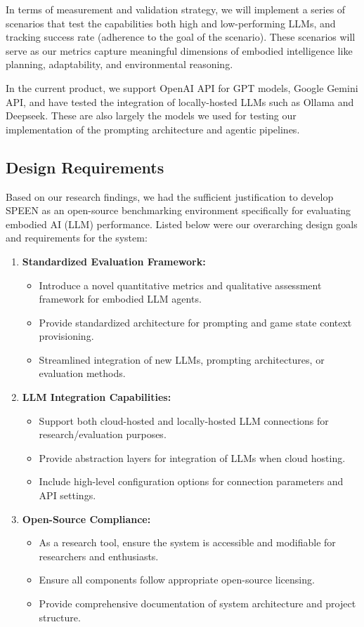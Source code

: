 \documentclass{article}
\begin{document}
In terms of measurement and validation strategy, we will implement a series of scenarios that test the capabilities both high and low-performing LLMs, and tracking success rate (adherence to the goal of the scenario).
These scenarios will serve as our metrics capture meaningful dimensions of embodied intelligence like planning, adaptability, and environmental reasoning.

In the current product, we support OpenAI API for GPT models, Google Gemini API, and have tested the integration of locally-hosted LLMs such as Ollama and Deepseek.
These are also largely the models we used for testing our implementation of the prompting architecture and agentic pipelines.

\subsection{Design Requirements}
Based on our research findings, we had the sufficient justification to develop SPEEN as an open-source benchmarking environment specifically for evaluating embodied AI (LLM) performance.
Listed below were our overarching design goals and requirements for the system:
\begin{enumerate}
    \item \textbf{Standardized Evaluation Framework:}
        \begin{itemize}
            \item Introduce a novel quantitative metrics and qualitative assessment framework for embodied LLM agents.
            \item Provide standardized architecture for prompting and game state context provisioning.
            \item Streamlined integration of new LLMs, prompting architectures, or evaluation methods.
        \end{itemize}
    \item \textbf{LLM Integration Capabilities:}
        \begin{itemize}
            \item Support both cloud-hosted and locally-hosted LLM connections for research/evaluation purposes.
            \item Provide abstraction layers for integration of LLMs when cloud hosting.
            \item Include high-level configuration options for connection parameters and API settings.
        \end{itemize}
    \item \textbf{Open-Source Compliance:}
        \begin{itemize}
            \item As a research tool, ensure the system is accessible and modifiable for researchers and enthusiasts.
            \item Ensure all components follow appropriate open-source licensing.
            \item Provide comprehensive documentation of system architecture and project structure.
        \end{itemize}
\end{enumerate}
\end{document}
